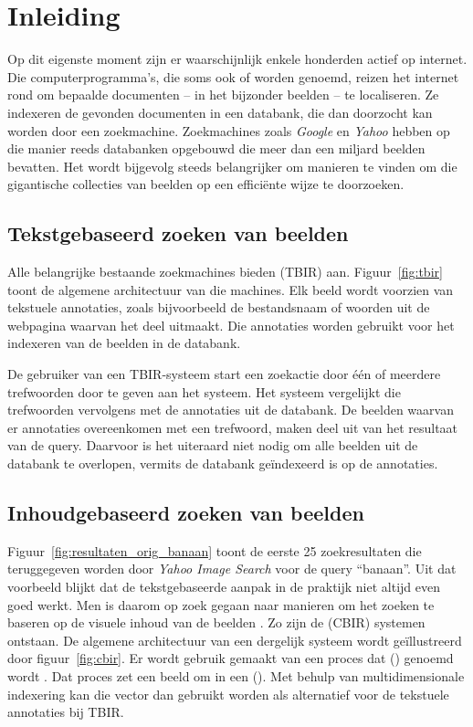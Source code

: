 \chapter{Inleiding}

Op dit eigenste moment zijn er waarschijnlijk enkele honderden  actief op internet.
Die computerprogramma's, die soms ook  of  worden genoemd, reizen
het internet rond om bepaalde documenten -- in het bijzonder beelden -- te localiseren. Ze indexeren
de gevonden documenten in een databank, die dan doorzocht kan worden door een zoekmachine. 
Zoekmachines zoals \emph{Google} en \emph{Yahoo} hebben op die manier reeds databanken
opgebouwd die meer dan een miljard beelden bevatten. Het wordt bijgevolg steeds belangrijker
om manieren te vinden om die gigantische collecties van beelden op een effici\"ente wijze
te doorzoeken.


\section{Tekstgebaseerd zoeken van beelden}

Alle belangrijke bestaande zoekmachines bieden  (TBIR) aan. 
Figuur~\ref{fig:tbir} toont de algemene architectuur van die machines. Elk beeld 
wordt voorzien van tekstuele annotaties, zoals bijvoorbeeld de 
bestandsnaam of woorden uit de webpagina waarvan het deel uitmaakt. Die annotaties
worden gebruikt voor het indexeren van de beelden in de databank.

De gebruiker van een TBIR-systeem start een zoekactie door \'e\'en of meerdere trefwoorden door te geven
aan het systeem. Het systeem vergelijkt die trefwoorden vervolgens met de annotaties uit
de databank. De beelden waarvan er annotaties overeenkomen met een trefwoord, maken
deel uit van het resultaat van de query. Daarvoor is het uiteraard niet nodig om alle beelden
uit de databank te overlopen, vermits de databank ge\"indexeerd is op de annotaties. 

\section{Inhoudgebaseerd zoeken van beelden}

Figuur~\ref{fig:resultaten_orig_banaan} toont de eerste 25 zoekresultaten die teruggegeven 
worden door \emph{Yahoo Image Search} voor de query ``banaan''. Uit dat voorbeeld
blijkt dat de tekstgebaseerde aanpak in de praktijk niet altijd even goed werkt. Men is 
daarom op zoek gegaan 
naar manieren om het zoeken te baseren op de visuele inhoud van de beelden 
\cite{smeulders:cbir_end_of_early_years}. Zo zijn de  (CBIR) systemen 
\cite{veltcamp:cbirs} ontstaan. 
De algemene architectuur van een dergelijk systeem wordt ge\"illustreerd door
figuur~\ref{fig:cbir}. Er wordt gebruik gemaakt van een proces dat 
() genoemd wordt \cite{rui:image_retr}. Dat proces zet een beeld om in een 
 (). Met behulp van multidimensionale indexering kan die
vector dan gebruikt worden als alternatief voor de tekstuele annotaties bij TBIR.


